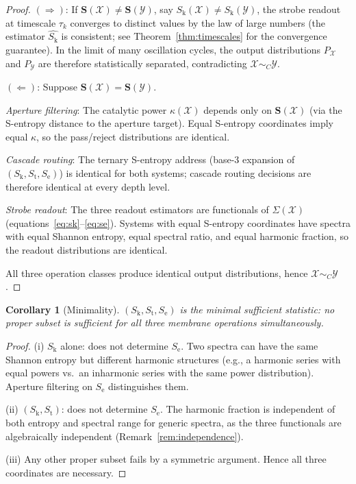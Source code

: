 \documentclass[11pt,twocolumn,a4paper]{article}
\newtheorem{corollary}[theorem]{Corollary}
\theoremstyle{definition}
\theoremstyle{remark}
\newcommand{\Sk}{S_{\mathrm{k}}}
\newcommand{\St}{S_{\mathrm{t}}}
\newcommand{\Se}{S_{\mathrm{e}}}
\newcommand{\Sent}{\bm{S}}
\begin{document}
\begin{proof}
$(\Rightarrow)$: If $\Sent(\mathcal{X}) \neq \Sent(\mathcal{Y})$, say
$\Sk(\mathcal{X}) \neq \Sk(\mathcal{Y})$, the strobe readout at timescale $\tau_k$
converges to distinct values by the law of large numbers (the estimator $\hat{\Sk}$
is consistent; see Theorem~\ref{thm:timescales} for the convergence guarantee).
In the limit of many oscillation cycles, the output distributions $P_{\mathcal{X}}$
and $P_{\mathcal{Y}}$ are therefore statistically separated, contradicting
$\mathcal{X} \sim_C \mathcal{Y}$.

$(\Leftarrow)$: Suppose $\Sent(\mathcal{X}) = \Sent(\mathcal{Y})$.

\textit{Aperture filtering}: The catalytic power $\kappa(\mathcal{X})$ depends
only on $\Sent(\mathcal{X})$ (via the S-entropy distance to the aperture target).
Equal S-entropy coordinates imply equal $\kappa$, so the pass/reject distributions
are identical.

\textit{Cascade routing}: The ternary S-entropy address (base-3 expansion of
$(\Sk, \St, \Se)$) is identical for both systems; cascade routing decisions
are therefore identical at every depth level.

\textit{Strobe readout}: The three readout estimators are functionals of
$\Sigma(\mathcal{X})$ (equations~\eqref{eq:sk}--\eqref{eq:se}). Systems with
equal S-entropy coordinates have spectra with equal Shannon entropy, equal
spectral ratio, and equal harmonic fraction, so the readout distributions
are identical.

All three operation classes produce identical output distributions, hence
$\mathcal{X} \sim_C \mathcal{Y}$.
\end{proof}

\begin{corollary}[Minimality]
\label{cor:minimal}
$(\Sk, \St, \Se)$ is the minimal sufficient statistic: no proper subset
is sufficient for all three membrane operations simultaneously.
\end{corollary}

\begin{proof}
(i) $\Sk$ alone: does not determine $\Se$. Two spectra can have the same
Shannon entropy but different harmonic structures (e.g., a harmonic series with
equal powers vs.\ an inharmonic series with the same power distribution).
Aperture filtering on $\Se$ distinguishes them.

(ii) $(\Sk, \St)$: does not determine $\Se$. The harmonic fraction is independent
of both entropy and spectral range for generic spectra, as the three functionals
are algebraically independent (Remark~\ref{rem:independence}).

(iii) Any other proper subset fails by a symmetric argument. Hence all three
coordinates are necessary.
\end{proof}
\end{document}
